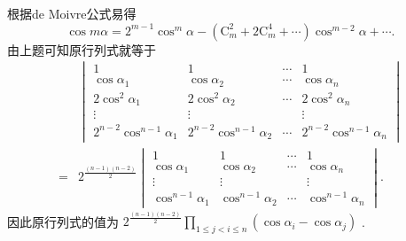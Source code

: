 \begin{sol}
	根据de Moivre公式易得
	\[
		\cos m\alpha=2^{m-1}\cos^m\alpha-(\mathrm{C}_m^2+2\mathrm{C}_m^4+\cdots)\cos^{m-2}\alpha+\cdots.
	\]
	由上题可知原行列式就等于
	\begin{align*}
		  & {}\begin{vmatrix}
			1                         & 1                         & \cdots & 1                         \\
			\cos\alpha_1              & \cos\alpha_2              & \cdots & \cos\alpha_n              \\
			2\cos^2\alpha_1           & 2\cos^2\alpha_2           & \cdots & 2\cos^2\alpha_n           \\
			\vdots                    & \vdots                    &        & \vdots                    \\
			2^{n-2}\cos^{n-1}\alpha_1 & 2^{n-2}\cos^{n-1}\alpha_2 & \cdots & 2^{n-2}\cos^{n-1}\alpha_n
		\end{vmatrix}                          \\
		= & {}2^{\frac{(n-1)(n-2)}{2}}\begin{vmatrix}
			1                  & 1                  & \cdots & 1                  \\
			\cos\alpha_1       & \cos\alpha_2       & \cdots & \cos\alpha_n       \\
			\vdots             & \vdots             &        & \vdots             \\
			\cos^{n-1}\alpha_1 & \cos^{n-1}\alpha_2 & \cdots & \cos^{n-1}\alpha_n
		\end{vmatrix}.
	\end{align*}
	因此原行列式的值为 $2^{\frac{(n-1)(n-2)}{2}}\displaystyle\prod_{1\le j<i\le n}(\cos\alpha_i-\cos\alpha_j)$ .
\end{sol}

